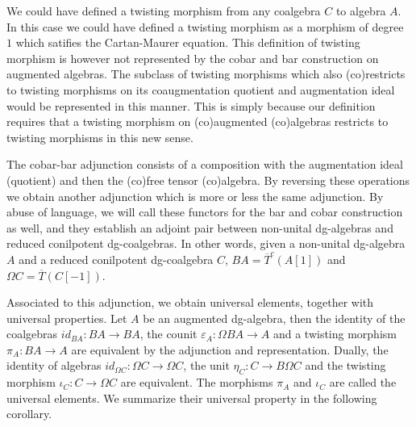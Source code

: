 \documentclass[../thesis.tex]{subfiles}
\begin{document}
            \begin{remark}
                We could have defined a twisting morphism from any coalgebra $C$ to algebra $A$. In this case we could have defined a twisting morphism as a morphism of degree $1$ which satifies the Cartan-Maurer equation. This definition of twisting morphism is however not represented by the cobar and bar construction on augmented algebras. The subclass of twisting morphisms which also (co)restricts to twisting morphisms on its coaugmentation quotient and augmentation ideal would be represented in this manner. This is simply because our definition requires that a twisting morphism on (co)augmented (co)algebras restricts to twisting morphisms in this new sense.

                The cobar-bar adjunction consists of a composition with the augmentation ideal (quotient) and then the (co)free tensor (co)algebra. By reversing these operations we obtain another adjunction which is more or less the same adjunction. By abuse of language, we will call these functors for the bar and cobar construction as well, and they establish an adjoint pair between non-unital dg-algebras and reduced conilpotent dg-coalgebras. In other words, given a non-unital dg-algebra $A$ and a reduced conilpotent dg-coalgebra $C$, $BA = \overline{T}^c(A[1])$ and $\Omega C = \overline{T}(C[-1])$.
                \begin{center}
                \end{center}
            \end{remark}

            Associated to this adjunction, we obtain universal elements, together with universal properties. Let $A$ be an augmented dg-algebra, then the identity of the coalgebras $id_{BA} : BA \rightarrow BA$, the counit $\varepsilon_A : \Omega BA \rightarrow A$ and a twisting morphism $\pi_A : BA \rightarrow A$ are equivalent by the adjunction and representation. Dually, the identity of algebras $id_{\Omega C} : \Omega C\rightarrow\Omega C$, the unit $\eta_C : C \rightarrow B\Omega C$ and the twisting morphism $\iota_C : C\rightarrow \Omega C$ are equivalent. The morphisms $\pi_A$ and $\iota_C$ are called the universal elements. We summarize their universal property in the following corollary.
\end{document}
